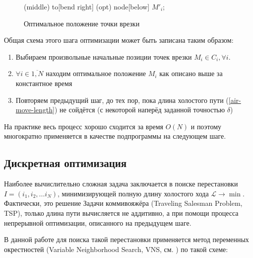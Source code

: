 \documentclass[10pt]{SPIIRAS_Proceedings}
\begin{document}
\begin{figure}
{{       (middle) to[bend right] (opt) node[below] {$M'_i$};
    }
  }
  \caption{Оптимальное положение точки врезки}
  \label{shift-pierce-point}
\end{figure}

Общая схема этого шага оптимизации может быть записана таким образом:
\begin{enumerate}
  \item
  Выбираем произвольные начальные позиции точек врезки
  $M_i \in C_i, \forall i$.
  \item
  $\forall i \in \overline{1,N}$
  находим оптимальное положение
  $M_i$
  как описано выше за константное время
  \item
  Повторяем предыдущий шаг,
  до тех пор,
  пока длина холостого пути
  (\ref{air-move-length})
  не сойдётся
  (с некоторой наперёд заданной точностью $\delta$)
\end{enumerate}

На практике весь процесс хорошо сходится
за время
$O(N)$
и поэтому многократно применяется
в качестве подпрограммы на следующем шаге.

\subsection{Дискретная оптимизация}

Наиболее вычислительно сложная задача
заключается в поиске перестановки
$I = (i_1, i_2, ... i_N)$,
минимизирующей полную длину холостого хода
$\mathcal{L} \to \min$.
Фактически,
это решение
Задачи коммивояжёра
(Traveling Salesman Problem, TSP),
только длина пути вычисляется
не аддитивно,
а при помощи процесса
непрерывной оптимизации,
описанного на предыдущем шаге.

В данной работе для поиска
такой перестановки применяется
метод переменных окрестностей
(Variable Neighborhood Search,
VNS, см. \cite{bi14})
по такой схеме:
\end{document}
